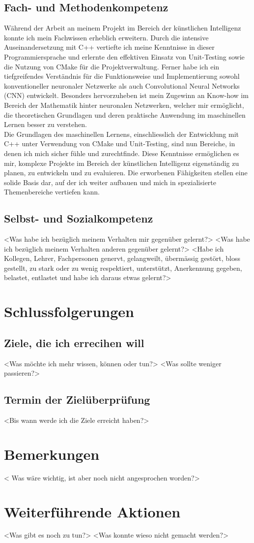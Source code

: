 \subsection{Fach- und Methodenkompetenz}
Während der Arbeit an meinem Projekt im Bereich der künstlichen Intelligenz konnte ich mein Fachwissen erheblich erweitern. Durch die intensive Auseinandersetzung mit C++ vertiefte ich meine Kenntnisse in dieser Programmiersprache und erlernte den effektiven Einsatz von Unit-Testing sowie die Nutzung von CMake für die Projektverwaltung. Ferner habe ich ein tiefgreifendes Verständnis für die Funktionsweise und Implementierung sowohl konventioneller neuronaler Netzwerke als auch Convolutional Neural Networks (CNN) entwickelt. Besonders hervorzuheben ist mein Zugewinn an Know-how im Bereich der Mathematik hinter neuronalen Netzwerken, welcher mir ermöglicht, die theoretischen Grundlagen und deren praktische Anwendung im maschinellen Lernen besser zu verstehen.
\\
Die Grundlagen des maschinellen Lernens, einschliesslich der Entwicklung mit C++ unter Verwendung von CMake und Unit-Testing, sind nun Bereiche, in denen ich mich sicher fühle und zurechtfinde. Diese Kenntnisse ermöglichen es mir, komplexe Projekte im Bereich der künstlichen Intelligenz eigenständig zu planen, zu entwickeln und zu evaluieren. Die erworbenen Fähigkeiten stellen eine solide Basis dar, auf der ich weiter aufbauen und mich in spezialisierte Themenbereiche vertiefen kann.

\subsection{Selbst- und Sozialkompetenz}
<Was habe ich bezüglich meinem Verhalten mir gegenüber gelernt?>
<Was habe ich bezüglich meinem Verhalten anderen gegenüber gelernt?>
<Habe ich Kollegen, Lehrer, Fachpersonen genervt, gelangweilt, übermässig gestört, bloss gestellt, zu stark oder zu wenig respektiert, unterstützt, Anerkennung gegeben, belastet, entlastet und habe ich daraus etwas gelernt?>

\section{Schlussfolgerungen}
\subsection{Ziele, die ich errecihen will}
<Was möchte ich mehr wissen, können oder tun?>
<Was sollte weniger passieren?>
\subsection{Termin der Zielüberprüfung}
<Bis wann werde ich die Ziele erreicht haben?>

\section{Bemerkungen}
< Was wäre wichtig, ist aber noch nicht angesprochen worden?>

\section{Weiterführende Aktionen}
<Was gibt es noch zu tun?>
<Was konnte wieso nicht gemacht werden?>
